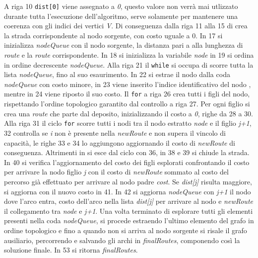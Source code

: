 \documentclass[]{article}
\begin{document}
A riga 10 \texttt{dist[0]} viene assegnato a  \emph{0}, questo valore non verrà mai utlizzato durante tutta l'esecuzione dell'algoritmo, serve solamente per mantenere una coerenza con gli indici dei vertici \emph{V}. Di conseguenza dalla riga 11 alla 15 di crea la strada corrispondente al nodo sorgente, con costo uguale a 0. In 17 si inizializza \textit{nodeQueue} con il nodo sorgente, la distanza pari a alla lunghezza di  \emph{route}  e la \emph{route} corrispondente.
In 18 si inizializza la variabile \textit{node} in 19 si ordina in ordine decrescente \textit{nodeQueue}. Alla riga 21 il \texttt{while} si occupa di scorre tutta la lista \textit{nodeQueue}, fino al suo esaurimento. In 22 si estrae il nodo dalla coda \textit{nodeQueue} con costo minore, in 23 viene inserito l'indice identificativo del nodo , mentre in 24 viene riposto il suo costo. Il \texttt{for} a riga 26 crea tutti i figli del nodo, rispettando l'ordine topologico garantito dal controllo a riga 27. Per ogni figlio si crea una \emph{route} che parte dal deposito, inizializzando il costo a \emph{0}, righe da 28 a 30. Alla riga 31 il ciclo \texttt{for} scorre tutti i nodi tra il nodo estratto  \textit{node} e il figlio \emph{j+1}, 32 controlla se \emph{i} non è presente nella \textit{newRoute} e non supera il vincolo di capacità, le righe 33 e 34 lo aggiungono aggiornando il costo di \textit{newRoute} di conseguenza.
Altrimenti in si esce dal ciclo con 36, in 38 e 39 si chiude la strada. In 40 si verifica l'aggiornamento del costo dei figli esplorati confrontando il costo per arrivare la nodo figlio \textit{j} con il costo di \textit{newRoute} sommato al costo del percorso già effettuato per arrivare al nodo padre \textit{cost}. Se \textit{dist[j]} risulta maggiore, si aggiorna con il nuovo costo in 41. In 42 si aggiorna \textit{nodeQueue} con \textit{j+1} il nodo dove l'arco entra, costo dell'arco nella lista \textit{dist[j]} per arrivare al nodo  e \textit{newRoute} il collegamento tra \textit{node} e \textit{j+1}. Una volta terminato di esplorare tutti gli elementi presenti nella coda \textit{nodeQueue}, si procede estraendo l'ultimo elemento del grafo in ordine topologico e fino a quando non si arriva al nodo sorgente si risale il grafo ausiliario, percorrendo e salvando gli archi in \textit{finalRoutes}, componendo così la soluzione finale. In 53 si ritorna \textit{finalRoutes}.
\end{document}
